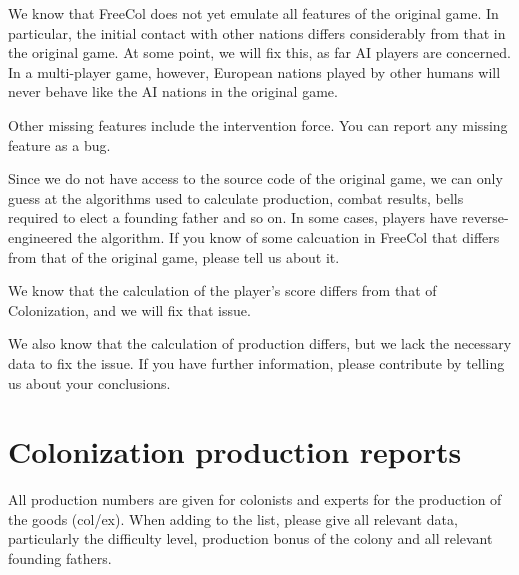 \documentclass[12pt]{book}
\begin{document}
We know that FreeCol does not yet emulate all features of the original
game. In particular, the initial contact with other nations differs
considerably from that in the original game. At some point, we will
fix this, as far AI players are concerned. In a multi-player game,
however, European nations played by other humans will never behave
like the AI nations in the original game.

Other missing features include the intervention force. You can report
any missing feature as a bug.

Since we do not have access to the source code of the original game,
we can only guess at the algorithms used to calculate production,
combat results, bells required to elect a founding father and so
on. In some cases, players have reverse-engineered the algorithm. If
you know of some calcuation in FreeCol that differs from that of the
original game, please tell us about it.

We know that the calculation of the player's score differs from that
of Colonization, and we will fix that issue.

We also know that the calculation of production differs, but we lack
the necessary data to fix the issue. If you have further information,
please contribute by telling us about your conclusions.


\hypertarget{Colonization production reports}
            {\section{Colonization production reports}}


All production numbers are given for colonists and experts for the
production of the goods (col/ex). When adding to the list, please give
all relevant data, particularly the difficulty level, production bonus
of the colony and all relevant founding fathers.
\end{document}

